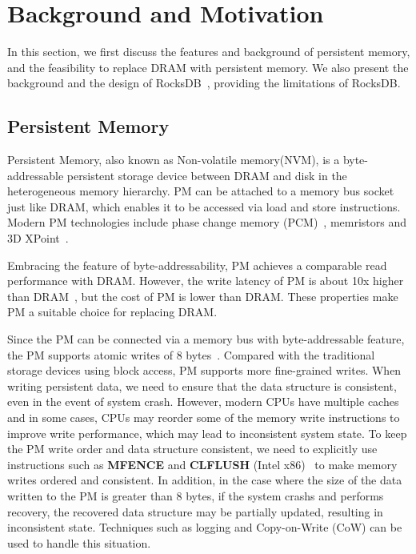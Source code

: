 \section{Background and Motivation}
In this section, we first discuss the features and background of persistent memory, and the feasibility to replace DRAM with persistent memory. We also present the background and the design of RocksDB~\cite{RocksDB}, providing the limitations of RocksDB.
\subsection{Persistent Memory}
Persistent Memory, also known as Non-volatile memory(NVM), is a byte-addressable persistent storage device between DRAM and disk in the heterogeneous memory hierarchy. PM can be attached to a memory bus socket just like DRAM, which enables it to be accessed via load and store instructions. Modern PM technologies include phase change memory (PCM)~\cite{PCM}, memristors and 3D XPoint~\cite{3DXPoint}.

Embracing the feature of byte-addressability, PM achieves a comparable read performance with DRAM. However, the write latency of PM is about 10x higher than DRAM~\cite{DBLP:conf/usenix/XiaJXS17}, but the cost of PM is lower than DRAM. These properties make PM a suitable choice for replacing DRAM.

Since the PM can be connected via a memory bus with byte-addressable feature, the PM supports atomic writes of 8 bytes~\cite{DBLP:conf/fast/LeeLSNN17}. Compared with the traditional storage devices using block access, PM supports more fine-grained writes. When writing persistent data, we need to ensure that the data structure is consistent, even in the event of system crash. However, modern CPUs have multiple caches and in some cases, CPUs may reorder some of the memory write instructions to improve write performance, which may lead to inconsistent system state. To keep the PM write order and data structure consistent, we need to explicitly use instructions such as \textbf{MFENCE} and \textbf{CLFLUSH} (Intel x86)~\cite{SLMDB,DBLP:conf/fast/LeeLSNN17,DBLP:conf/usenix/KannanBGAA18} to make memory writes ordered and consistent. In addition, in the case where the size of the data written to the PM is greater than 8 bytes, if the system crashs and performs recovery, the recovered data structure may be partially updated, resulting in inconsistent state. Techniques such as logging and Copy-on-Write (CoW) can be used to handle this situation.


